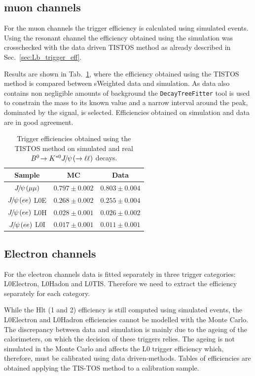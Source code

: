 \subsection{muon channels}

For the muon channels the trigger efficiency is calculated using simulated events.
Using the resonant channel the efficiency obtained using the simulation
was crosschecked with the data driven TISTOS method as already described in Sec.~\ref{sec:Lb_trigger_eff}.

Results are shown in Tab.~\ref{tab:tistos}, where the efficiency
obtained using the TISTOS method is compared between sWeighted data and simulation.
As data also contains non negligible amounts of background
the \verb!DecayTreeFitter! tool is used to constrain the \jpsi mass to its known value
and a narrow interval around the peak, dominated by the signal, is selected.
Efficiencies obtained on simulation and data are in good agreement.

\begin{table}[hb!]
\begin{center}
 \caption{Trigger efficiencies obtained using the TISTOS method on
 simulated and real $\decay{\Bz}{\Kstarz\jpsi(\to\ell\ell)}$ decays.}
\begin{tabular}{|c|c|c|}
\hline
 Sample 							&  MC  			& Data 	\\ \hline
 $\jpsi(\mu\mu)$	& $ 0.797  \pm  0.002 $ & $ 0.803  \pm  0.004 $  \\
 $\jpsi(ee)$ L0E 	& $ 0.268  \pm  0.002 $ & $ 0.255  \pm  0.004 $  \\
 $\jpsi(ee)$ L0H 	& $ 0.028  \pm  0.001 $ & $ 0.026  \pm  0.002 $  \\
 $\jpsi(ee)$ L0I 	& $ 0.017  \pm  0.001 $ & $ 0.011  \pm  0.001 $  \\
 \hline 
  \end{tabular}
\label{tab:tistos}
\end{center}
\end{table}

\subsection{Electron channels}

For the electron channels data is fitted separately in three trigger categories: L0Electron, L0Hadon and L0TIS.
Therefore we need to extract the efficiency separately for each category.

While the Hlt (1 and 2) efficiency is still computed using simulated events,
the L0Electron and L0Hadron efficiencies cannot be modelled with the Monte Carlo.
The discrepancy between data and simulation is mainly due to the ageing of the 
calorimeters, on which the decision of these triggers relies. The ageing is not simulated
in the Monte Carlo and affects the L0 trigger efficiency which, therefore, must
be calibrated using data driven-methods. Tables of efficiencies are obtained
applying the TIS-TOS method to a calibration sample.

